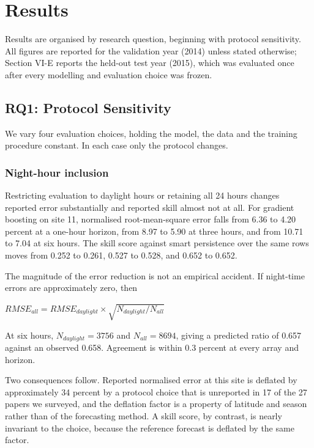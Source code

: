 \section{Results}

Results are organised by research question, beginning with protocol
sensitivity. All figures are reported for the validation year (2014)
unless stated otherwise; Section VI-E reports the held-out test year
(2015), which was evaluated once after every modelling and evaluation
choice was frozen.

\subsection{RQ1: Protocol Sensitivity}
\label{sec:rq1}

We vary four evaluation choices, holding the model, the data and the
training procedure constant. In each case only the protocol changes.



\subsubsection{Night-hour inclusion}

Restricting evaluation to daylight hours or retaining all 24 hours
changes reported error substantially and reported skill almost not at
all. For gradient boosting on site 11, normalised root-mean-square error
falls from 6.36 to 4.20 percent at a one-hour horizon, from 8.97 to 5.90
at three hours, and from 10.71 to 7.04 at six hours. The skill score
against smart persistence over the same rows moves from 0.252 to 0.261,
0.527 to 0.528, and 0.652 to 0.652.

The magnitude of the error reduction is not an empirical accident. If
night-time errors are approximately zero, then

  $RMSE_{all} = RMSE_{daylight} \times \sqrt{N_{daylight} / N_{all}}$

At six hours, $N_{daylight} = 3756$ and $N_{all} = 8694$, giving a predicted
ratio of 0.657 against an observed 0.658. Agreement is within 0.3
percent at every array and horizon.

Two consequences follow. Reported normalised error at this site is
deflated by approximately 34 percent by a protocol choice that is
unreported in 17 of the 27 papers we surveyed, and the deflation factor
is a property of latitude and season rather than of the forecasting
method. A skill score, by contrast, is nearly invariant to the choice,
because the reference forecast is deflated by the same factor.

